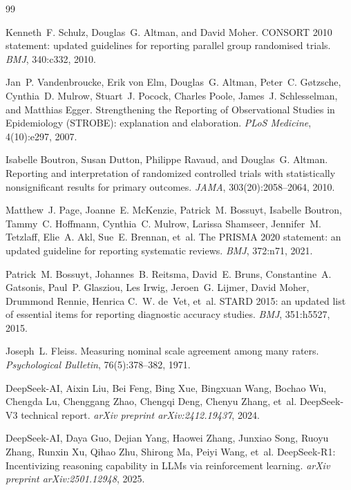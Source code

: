 \documentclass[11pt,a4paper]{article}
\begin{document}
\begin{thebibliography}{99}
\setlength{\itemsep}{1.8pt}

Kenneth~F. Schulz, Douglas~G. Altman, and David Moher.
\newblock CONSORT 2010 statement: updated guidelines for reporting parallel group randomised trials.
\newblock \emph{BMJ}, 340:c332, 2010.

Jan~P. Vandenbroucke, Erik von Elm, Douglas~G. Altman, Peter~C. G{\o}tzsche, Cynthia~D. Mulrow, Stuart~J. Pocock, Charles Poole, James~J. Schlesselman, and Matthias Egger.
\newblock Strengthening the Reporting of Observational Studies in Epidemiology (STROBE): explanation and elaboration.
\newblock \emph{PLoS Medicine}, 4(10):e297, 2007.

Isabelle Boutron, Susan Dutton, Philippe Ravaud, and Douglas~G. Altman.
\newblock Reporting and interpretation of randomized controlled trials with statistically nonsignificant results for primary outcomes.
\newblock \emph{JAMA}, 303(20):2058--2064, 2010.

Matthew~J. Page, Joanne~E. McKenzie, Patrick~M. Bossuyt, Isabelle Boutron, Tammy~C. Hoffmann, Cynthia~C. Mulrow, Larissa Shamseer, Jennifer~M. Tetzlaff, Elie~A. Akl, Sue~E. Brennan, et~al.
\newblock The PRISMA 2020 statement: an updated guideline for reporting systematic reviews.
\newblock \emph{BMJ}, 372:n71, 2021.

Patrick~M. Bossuyt, Johannes~B. Reitsma, David~E. Bruns, Constantine~A. Gatsonis, Paul~P. Glasziou, Les Irwig, Jeroen~G. Lijmer, David Moher, Drummond Rennie, Henrica C.~W. de~Vet, et~al.
\newblock STARD 2015: an updated list of essential items for reporting diagnostic accuracy studies.
\newblock \emph{BMJ}, 351:h5527, 2015.

Joseph~L. Fleiss.
\newblock Measuring nominal scale agreement among many raters.
\newblock \emph{Psychological Bulletin}, 76(5):378--382, 1971.

DeepSeek-AI, Aixin Liu, Bei Feng, Bing Xue, Bingxuan Wang, Bochao Wu, Chengda Lu, Chenggang Zhao, Chengqi Deng, Chenyu Zhang, et~al.
\newblock DeepSeek-V3 technical report.
\newblock \emph{arXiv preprint arXiv:2412.19437}, 2024.

DeepSeek-AI, Daya Guo, Dejian Yang, Haowei Zhang, Junxiao Song, Ruoyu Zhang, Runxin Xu, Qihao Zhu, Shirong Ma, Peiyi Wang, et~al.
\newblock DeepSeek-R1: Incentivizing reasoning capability in LLMs via reinforcement learning.
\newblock \emph{arXiv preprint arXiv:2501.12948}, 2025.


\end{thebibliography}
\end{document}
